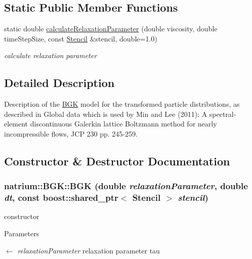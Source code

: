 \subsection*{Static Public Member Functions}
\begin{DoxyCompactItemize}
\item 
static double \hyperlink{classnatrium_1_1BGK_a430f5020b6101a64d89a0cc2a246260e}{calculateRelaxationParameter} (double viscosity, double timeStepSize, const \hyperlink{classnatrium_1_1Stencil}{Stencil} \&stencil, double=1.0)
\begin{DoxyCompactList}\small\item\em calculate relaxation parameter \item\end{DoxyCompactList}\end{DoxyCompactItemize}


\subsection{Detailed Description}
Description of the \hyperlink{classnatrium_1_1BGK}{BGK} model for the transformed particle distributions, as described in Global data which is used by Min and Lee (2011): A spectral-\/element discontinuous Galerkin lattice Boltzmann method for nearly incompressible flows, JCP 230 pp. 245-\/259. 

\subsection{Constructor \& Destructor Documentation}
\hypertarget{classnatrium_1_1BGK_adf78ea65d5b96f55dc719b7ab7beb86d}{
\subsubsection[{BGK}]{\setlength{\rightskip}{0pt plus 5cm}natrium::BGK::BGK (double {\em relaxationParameter}, \/  double {\em dt}, \/  const boost::shared\_\-ptr$<$ {\bf Stencil} $>$ {\em stencil})}}
\label{classnatrium_1_1BGK_adf78ea65d5b96f55dc719b7ab7beb86d}


constructor 
\begin{DoxyParams}{Parameters}
\item[\mbox{$\leftarrow$} {\em relaxationParameter}]relaxation parameter tau \end{DoxyParams}


